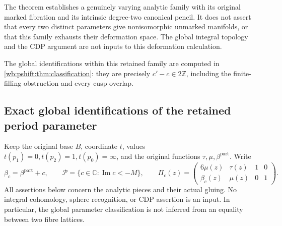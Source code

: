 The theorem establishes a genuinely varying analytic family with its
original marked fibration and its intrinsic degree-two canonical pencil.
It does not assert that every two distinct parameters give nonisomorphic
unmarked manifolds, or that this family exhausts their deformation space.
The global integral topology and the CDP argument are not inputs to this
deformation calculation.


The global identifications within this retained family are computed in
\cref{wb:pshift:thm:classification}: they are precisely $c'-c\in2\mathbb Z$,
including the finite-filling obstruction and every cusp overlap.


\subsection{Exact global identifications of the retained period parameter}
\label{wb:pshift:sec:classification}

Keep the original base $B$, coordinate $t$, values
$t(p_1)=0,t(p_2)=1,t(p_0)=\infty$, and the original functions
$\tau,\mu,\beta^{\mathrm{part}}$. Write
\[
 \beta_c=\beta^{\mathrm{part}}+c,\qquad
 \mathcal P=\{c\in\mathbb C:\operatorname{Im}c<-M\},\qquad
 \Pi_c(z)=\begin{pmatrix}6\mu(z)&\tau(z)&1&0\\
                      \beta_c(z)&\mu(z)&0&1\end{pmatrix}.
 \tag{PS1}\label{wb:pshift:eq:periods}
\]
All assertions below concern the analytic pieces and their actual gluing.
No integral cohomology, sphere recognition, or CDP assertion is an input.
In particular, the global parameter classification is not inferred from
an equality between two fibre lattices.

